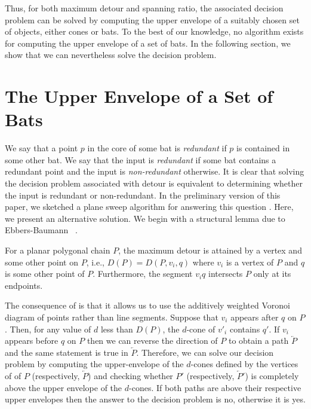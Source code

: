 \documentclass[lotsofwhite]{patmorin}
\begin{document}
Thus, for both maximum detour and spanning ratio, the associated
decision problem can be solved by computing the upper envelope of a
suitably chosen set of objects, either cones or bats. To the best of
our knowledge, no algorithm exists for computing the upper envelope of
a set of bats.  In the following section, we show that we can
nevertheless solve the decision problem.

\section{The Upper Envelope of a Set of Bats}

We say that a point $p$ in the core of some bat is \emph{redundant} if
$p$ is contained in some other bat.  We say that the input is
\emph{redundant} if some bat contains a redundant point and the input
is \emph{non-redundant} otherwise.  It is clear that solving the
decision problem associated with detour is equivalent to determining
whether the input is redundant or non-redundant.  In the preliminary
version of this paper, we sketched a plane sweep algorithm for
answering this question \cite{lms02}.  Here, we present an alternative
solution.  We begin with a structural lemma due to Ebbers-Baumann
\etal\ \cite{ekll01}.

\begin{lem}
For a planar polygonal chain $P$, the maximum detour is attained by a
vertex and some other point on $P$, i.e., $D(P)=D(P,v_i,q)$ where
$v_i$ is a vertex of $P$ and $q$ is some other point of $P$.
Furthermore, the segment $v_iq$ intersects $P$ only at its endpoints.
\end{lem}

The consequence of  is that it allows us to use
the additively weighted Voronoi diagram of points rather than line
segments.  Suppose that $v_i$ appears after $q$ on $P$.  Then, for any
value of $d$ less than $D(P)$, the $d$-cone of $v'_i$ contains $q'$.
If $v_i$ appears before $q$ on $P$ then we can reverse the direction
of $P$ to obtain a path $\overleftarrow{P}$ and the same statement is
true in $\overleftarrow{P}$.  Therefore, we can solve our decision
problem by computing the upper-envelope of the $d$-cones defined by
the vertices of of $P$ (respectively, $\overleftarrow{P}$) and
checking whether $P'$ (respectively, $\overleftarrow{P}'$) is
completely above the upper envelope of the $d$-cones.  If both paths
are above their respective upper envelopes then the answer to the
decision problem is no, otherwise it is yes.
\end{document}
